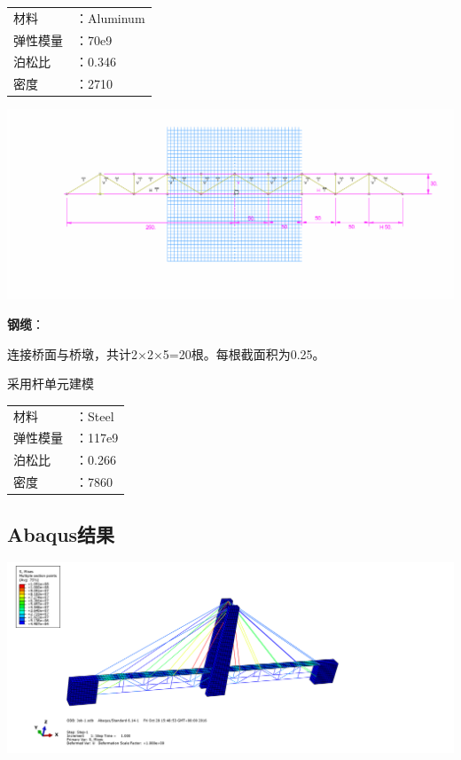 \documentclass[UTF8]{ctexbook}
\begin{document}
\begin{center}
\begin{tabular}{ll}
材料&：Aluminum\\
弹性模量&：70e9\\
泊松比&：0.346\\
密度&：2710\\
\end{tabular}
\end{center}

\includegraphics[width=\textwidth]{04.png}

\textbf{钢缆}：

连接桥面与桥墩，共计2×2×5=20根。每根截面积为0.25。

采用杆单元建模

\begin{center}
\begin{tabular}{ll}
材料&：Steel\\
弹性模量&：117e9\\
泊松比&：0.266\\
密度&：7860\\
\end{tabular}
\end{center}

\subsection{Abaqus结果}
\includegraphics[width=\textwidth]{05.png}
\end{document}

